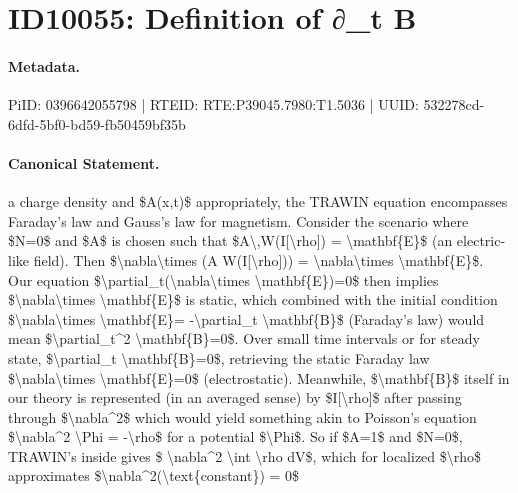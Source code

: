 \section*{ID10055: Definition of ∂\_t B}
\paragraph{Metadata.}
PiID: 0396642055798 | RTEID: RTE:P39045.7980:T1.5036 | UUID: 532278cd-6dfd-5bf0-bd59-fb50459bf35b

\paragraph{Canonical Statement.}
a charge density and \$A(x,t)\$ appropriately, the TRAWIN equation encompasses Faraday’s law and Gauss’s law for magnetism. Consider the scenario where \$N=0\$ and \$A\$ is chosen such that \$A\textbackslash{},W(I[\textbackslash{}rho]) = \textbackslash{}mathbf\{E\}\$ (an electric-like field). Then \$\textbackslash{}nabla\textbackslash{}times (A W(I[\textbackslash{}rho])) = \textbackslash{}nabla\textbackslash{}times \textbackslash{}mathbf\{E\}\$. Our equation \$\textbackslash{}partial\_t(\textbackslash{}nabla\textbackslash{}times \textbackslash{}mathbf\{E\})=0\$ then implies \$\textbackslash{}nabla\textbackslash{}times \textbackslash{}mathbf\{E\}\$ is static, which combined with the initial condition \$\textbackslash{}nabla\textbackslash{}times \textbackslash{}mathbf\{E\}= -\textbackslash{}partial\_t \textbackslash{}mathbf\{B\}\$ (Faraday’s law) would mean \$\textbackslash{}partial\_t\textasciicircum{}2 \textbackslash{}mathbf\{B\}=0\$. Over small time intervals or for steady state, \$\textbackslash{}partial\_t \textbackslash{}mathbf\{B\}=0\$, retrieving the static Faraday law \$\textbackslash{}nabla\textbackslash{}times \textbackslash{}mathbf\{E\}=0\$ (electrostatic). Meanwhile, \$\textbackslash{}mathbf\{B\}\$ itself in our theory is represented (in an averaged sense) by \$I[\textbackslash{}rho]\$ after passing through \$\textbackslash{}nabla\textasciicircum{}2\$ which would yield something akin to Poisson’s equation \$\textbackslash{}nabla\textasciicircum{}2 \textbackslash{}Phi = -\textbackslash{}rho\$ for a potential \$\textbackslash{}Phi\$. So if \$A=1\$ and \$N=0\$, TRAWIN’s inside gives \$ \textbackslash{}nabla\textasciicircum{}2 \textbackslash{}int \textbackslash{}rho dV\$, which for localized \$\textbackslash{}rho\$ approximates \$\textbackslash{}nabla\textasciicircum{}2(\textbackslash{}text\{constant\}) = 0\$

